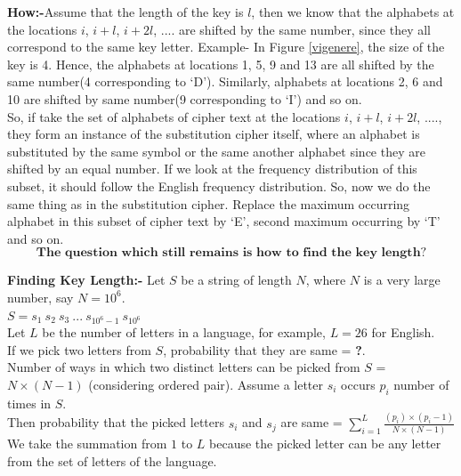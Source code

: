\documentclass{llncs}
\begin{document}
\textbf{{\large How:-}}Assume that the length of the key is $l$, then we know that the alphabets at the locations $i$, $i+l$, $i+2l$, .... are shifted by the same number, since they all correspond to the same key letter. Example- In Figure \ref{vigenere}, the size of the key is 4. Hence, the alphabets at locations 1, 5, 9 and 13 are all shifted by the same number(4 corresponding to `D'). Similarly, alphabets at locations 2, 6 and 10 are shifted by same number(9 corresponding to `I') and so on. \\

So, if take the set of alphabets of cipher text at the locations $i$, $i+l$, $i+2l$, ...., they form an instance of the substitution cipher itself, where an alphabet is substituted by the same symbol or the same another alphabet since they are shifted by an equal number. If we look at the frequency distribution of this subset, it should follow the English frequency distribution. So, now we do the same thing as in the substitution cipher. Replace the maximum occurring alphabet in this subset of cipher text by `E', second maximum occurring by `T' and so on. \\

\[
 \boxed{\textbf{The\ question\ which\ still\ remains\ is\ how\ to\ find\ the\ key\ length?}}
 \]
 
\textbf{{\large Finding Key Length:-}} Let $S$ be a string of length $N$, where $N$ is a very large number, say $N = 10^6$. \\

$S = s_1\ s_2\ s_3\ ...\ s_{10^6-1}\ s_{10^6}$\\

Let $L$ be the number of letters in a language, for example, $L=26$ for English. \\

If we pick two letters from $S$, probability that they are same = \textbf{?}. \\

Number of ways in which two distinct letters can be picked from $S$ = $N \times (N-1)$ (considering ordered pair). Assume a letter $s_i$ occurs $p_i$ number of times in $S$. \\

Then probability that the picked letters $s_i$ and $s_j$ are same = $\sum_{i=1}^L \frac{(p_i) \times (p_i - 1)}{ N \times (N-1)}$ \\

We take the summation from $1$ to $L$ because the picked letter can be any letter from the set of letters of the language. \\
\end{document}

